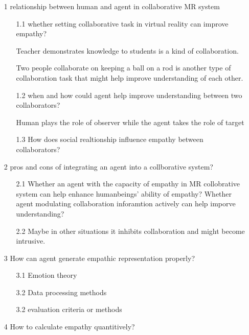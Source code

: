 \documentclass{article}
\begin{document}
\begin{enumerate}
\item[1] relationship between human and agent in collaborative MR system
\begin{enumerate}
    \item[1.1]whether setting collaborative task in virtual reality can improve empathy? 
    
    Teacher demonstrates knowledge to students is a kind of collaboration.
    
    Two people collaborate on keeping a ball on a rod is another type of collaboration task that 
    might help improve understanding of each other.

    \item[1.2] when and how could agent help improve understanding between two collaborators?

    Human plays the role of observer while the agent takes the role of target

    \item[1.3] How does social realtionship influence empathy between collaborators?
 
\end{enumerate} 

\item[2]pros and cons of integrating an agent into a collborative system?
\begin{enumerate}
    \item[2.1]Whether an agent with the capacity of empathy in MR collobrative system can help 
    enhance humanbeings' ability of empathy? Whether agent modulating collaboration inforamtion actively can help imporve understanding?
    \item[2.2]Maybe in other situations it inhibits collaboration and might become intrusive.
 
\end{enumerate}

\item[3]How can agent generate empathic representation properly?
\begin{enumerate}
    \item[3.1]Emotion theory
    \item[3.2]Data processing methods 
    \item[3.2]evaluation criteria or methods
 
\end{enumerate} 

\item[4]How to calculate empathy quantitively?


\end{enumerate}
\end{document}
